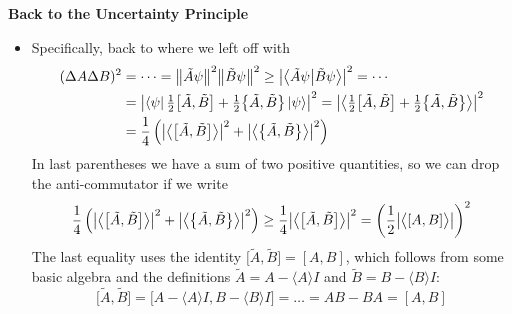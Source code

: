 \documentclass[11pt, a4paper]{article}
\begin{document}
\textbf{Back to the Uncertainty Principle}
\begin{itemize}
	\item Specifically, back to where we left off with
	\begin{align*}
		(\Delta A \Delta B)^{2} &= \cdots = \norm{\tilde{A}\psi}^{2}\norm{\tilde{B}\psi}^{2} \geq \abs{\braket{\tilde{A}\psi}{\tilde{B}\psi}}^{2} = \cdots \\
		& = \abs{\bra{\psi}\tfrac{1}{2}\big[\tilde{A}, \tilde{B}\big] + \tfrac{1}{2}\big\{ \tilde{A}, \tilde{B}\big\}\ket{\psi} }^{2} = \abs{\left\langle \tfrac{1}{2}\big[\tilde{A}, \tilde{B}\big] + \tfrac{1}{2}\big\{ \tilde{A}, \tilde{B}\big\} \right\rangle}^{2}\\
		&= \frac{1}{4}\left(\abs{\big\langle \big[\tilde{A}, \tilde{B}\big] \big\rangle}^{2} + \abs{\big\langle \big\{\tilde{A}, \tilde{B}\big\} \big\rangle}^{2}\right) 
	\end{align*}
	In last parentheses we have a sum of two positive quantities, so we can drop the anti-commutator if we write
	\begin{equation*}
		\frac{1}{4}\left(\abs{\big\langle \big[\tilde{A}, \tilde{B}\big] \big\rangle}^{2} + \abs{\big\langle \big\{\tilde{A}, \tilde{B}\big\} \big\rangle}^{2}\right)  \geq \frac{1}{4}\abs{\big\langle \big[\tilde{A}, \tilde{B}\big] \big\rangle}^{2} = \left(\frac{1}{2}\abs{\big\langle [A, B] \big\rangle}\right)^{2}
	\end{equation*}
	The last equality uses the identity $ \big[\tilde{A}, \tilde{B}\big] = [A, B] $, which follows from  some basic algebra and the definitions $ \tilde{A} = A - \langle A \rangle I $ and $ \tilde{B} = B - \langle B \rangle I $:
	\begin{equation*}
		\big[\tilde{A}, \tilde{B}\big] = \big [A - \langle A \rangle I, B - \langle B \rangle I \big ] = \ldots = AB - BA = [A, B]
	\end{equation*}
	

\end{itemize}
\end{document}

